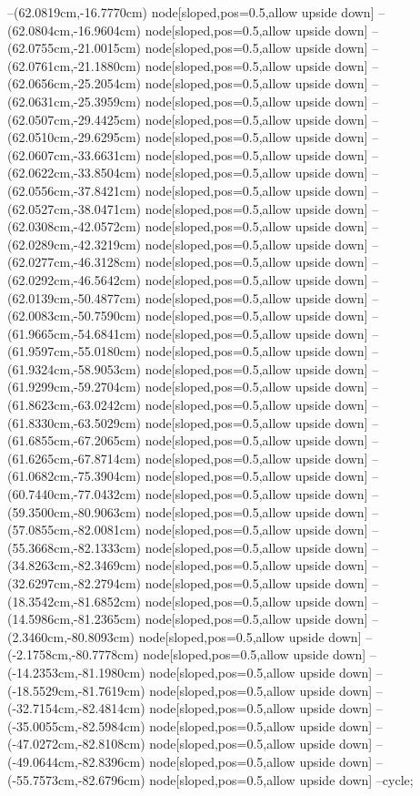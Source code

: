 --(62.0819cm,-16.7770cm) node[sloped,pos=0.5,allow upside down]{\ArrowIn}
--(62.0804cm,-16.9604cm) node[sloped,pos=0.5,allow upside down]{\arrowIn}
--(62.0755cm,-21.0015cm) node[sloped,pos=0.5,allow upside down]{\ArrowIn}
--(62.0761cm,-21.1880cm) node[sloped,pos=0.5,allow upside down]{\arrowIn}
--(62.0656cm,-25.2054cm) node[sloped,pos=0.5,allow upside down]{\ArrowIn}
--(62.0631cm,-25.3959cm) node[sloped,pos=0.5,allow upside down]{\arrowIn}
--(62.0507cm,-29.4425cm) node[sloped,pos=0.5,allow upside down]{\ArrowIn}
--(62.0510cm,-29.6295cm) node[sloped,pos=0.5,allow upside down]{\arrowIn}
--(62.0607cm,-33.6631cm) node[sloped,pos=0.5,allow upside down]{\ArrowIn}
--(62.0622cm,-33.8504cm) node[sloped,pos=0.5,allow upside down]{\arrowIn}
--(62.0556cm,-37.8421cm) node[sloped,pos=0.5,allow upside down]{\ArrowIn}
--(62.0527cm,-38.0471cm) node[sloped,pos=0.5,allow upside down]{\arrowIn}
--(62.0308cm,-42.0572cm) node[sloped,pos=0.5,allow upside down]{\ArrowIn}
--(62.0289cm,-42.3219cm) node[sloped,pos=0.5,allow upside down]{\arrowIn}
--(62.0277cm,-46.3128cm) node[sloped,pos=0.5,allow upside down]{\ArrowIn}
--(62.0292cm,-46.5642cm) node[sloped,pos=0.5,allow upside down]{\arrowIn}
--(62.0139cm,-50.4877cm) node[sloped,pos=0.5,allow upside down]{\ArrowIn}
--(62.0083cm,-50.7590cm) node[sloped,pos=0.5,allow upside down]{\arrowIn}
--(61.9665cm,-54.6841cm) node[sloped,pos=0.5,allow upside down]{\ArrowIn}
--(61.9597cm,-55.0180cm) node[sloped,pos=0.5,allow upside down]{\arrowIn}
--(61.9324cm,-58.9053cm) node[sloped,pos=0.5,allow upside down]{\ArrowIn}
--(61.9299cm,-59.2704cm) node[sloped,pos=0.5,allow upside down]{\arrowIn}
--(61.8623cm,-63.0242cm) node[sloped,pos=0.5,allow upside down]{\ArrowIn}
--(61.8330cm,-63.5029cm) node[sloped,pos=0.5,allow upside down]{\arrowIn}
--(61.6855cm,-67.2065cm) node[sloped,pos=0.5,allow upside down]{\ArrowIn}
--(61.6265cm,-67.8714cm) node[sloped,pos=0.5,allow upside down]{\arrowIn}
--(61.0682cm,-75.3904cm) node[sloped,pos=0.5,allow upside down]{\ArrowIn}
--(60.7440cm,-77.0432cm) node[sloped,pos=0.5,allow upside down]{\ArrowIn}
--(59.3500cm,-80.9063cm) node[sloped,pos=0.5,allow upside down]{\ArrowIn}
--(57.0855cm,-82.0081cm) node[sloped,pos=0.5,allow upside down]{\ArrowIn}
--(55.3668cm,-82.1333cm) node[sloped,pos=0.5,allow upside down]{\ArrowIn}
--(34.8263cm,-82.3469cm) node[sloped,pos=0.5,allow upside down]{\ArrowIn}
--(32.6297cm,-82.2794cm) node[sloped,pos=0.5,allow upside down]{\ArrowIn}
--(18.3542cm,-81.6852cm) node[sloped,pos=0.5,allow upside down]{\ArrowIn}
--(14.5986cm,-81.2365cm) node[sloped,pos=0.5,allow upside down]{\ArrowIn}
--(2.3460cm,-80.8093cm) node[sloped,pos=0.5,allow upside down]{\ArrowIn}
--(-2.1758cm,-80.7778cm) node[sloped,pos=0.5,allow upside down]{\ArrowIn}
--(-14.2353cm,-81.1980cm) node[sloped,pos=0.5,allow upside down]{\ArrowIn}
--(-18.5529cm,-81.7619cm) node[sloped,pos=0.5,allow upside down]{\ArrowIn}
--(-32.7154cm,-82.4814cm) node[sloped,pos=0.5,allow upside down]{\ArrowIn}
--(-35.0055cm,-82.5984cm) node[sloped,pos=0.5,allow upside down]{\ArrowIn}
--(-47.0272cm,-82.8108cm) node[sloped,pos=0.5,allow upside down]{\ArrowIn}
--(-49.0644cm,-82.8396cm) node[sloped,pos=0.5,allow upside down]{\ArrowIn}
--(-55.7573cm,-82.6796cm) node[sloped,pos=0.5,allow upside down]{\ArrowIn}
--cycle;
